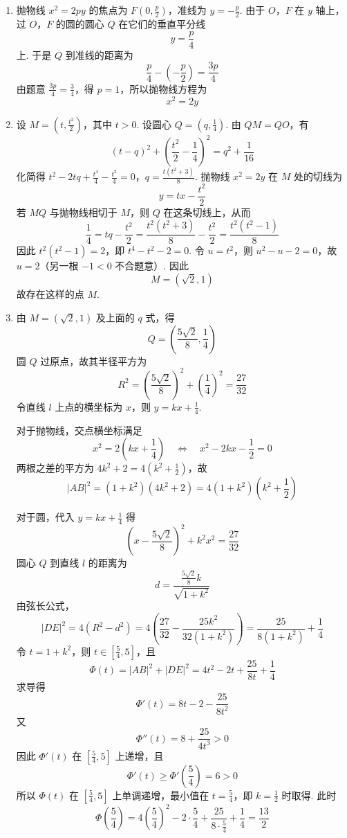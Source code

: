 \begin{solution}
\begin{enumerate}
\item
抛物线 \(x^2=2py\) 的焦点为 \(F\left(0,\frac p2\right)\)，准线为 \(y=-\frac p2\). 由于 \(O\)，\(F\) 在 \(y\) 轴上，过 \(O\)，\(F\) 的圆的圆心 \(Q\) 在它们的垂直平分线
\[
y=\frac p4
\]
上. 于是 \(Q\) 到准线的距离为
\[
\frac p4-\left(-\frac p2\right)=\frac{3p}{4}
\]
由题意 \(\frac{3p}{4}=\frac34\)，得 \(p=1\)，所以抛物线方程为
\[
x^2=2y
\]
\item
设 \(M=(t,\frac{t^2}{2})\)，其中 \(t>0\). 设圆心 \(Q=(q,\frac14)\). 由 \(QM=QO\)，有
\[
(t-q)^2+\left(\frac{t^2}{2}-\frac14\right)^2
=q^2+\frac1{16}
\]
化简得
\(t^2-2tq+\frac{t^4}{4}-\frac{t^2}{4}=0\)，\(q=\frac{t(t^2+3)}8\).
抛物线 \(x^2=2y\) 在 \(M\) 处的切线为
\[
y=tx-\frac{t^2}{2}
\]
若 \(MQ\) 与抛物线相切于 \(M\)，则 \(Q\) 在这条切线上，从而
\[
\frac14=tq-\frac{t^2}{2}
=\frac{t^2(t^2+3)}8-\frac{t^2}{2}
=\frac{t^2(t^2-1)}8
\]
因此
\(t^2(t^2-1)=2\)，即 \(t^4-t^2-2=0\).
令 \(u=t^2\)，则 \(u^2-u-2=0\)，故
\(u=2\)（另一根 \(-1<0\) 不合题意）. 因此
\[
M=(\sqrt2,1)
\]
故存在这样的点 \(M\).
\item
由 \(M=(\sqrt2,1)\) 及上面的 \(q\) 式，得
\[
Q=\left(\frac{5\sqrt2}{8},\frac14\right)
\]
圆 \(Q\) 过原点，故其半径平方为
\[
R^2=\left(\frac{5\sqrt2}{8}\right)^2+\left(\frac14\right)^2
=\frac{27}{32}
\]
令直线 \(l\) 上点的横坐标为 \(x\)，则 \(y=kx+\frac14\).

对于抛物线，交点横坐标满足
\[
x^2=2\left(kx+\frac14\right)
\quad\Longleftrightarrow\quad
x^2-2kx-\frac12=0
\]
两根之差的平方为 \(4k^2+2=4(k^2+\frac12)\)，故
\[
|AB|^2=(1+k^2)\left(4k^2+2\right)
=4(1+k^2)\left(k^2+\frac12\right)
\]

对于圆，代入 \(y=kx+\frac14\) 得
\[
\left(x-\frac{5\sqrt2}{8}\right)^2+k^2x^2=\frac{27}{32}
\]
圆心 \(Q\) 到直线 \(l\) 的距离为
\[
d=\frac{\frac{5\sqrt2}{8}k}{\sqrt{1+k^2}}
\]
由弦长公式，
\[
|DE|^2=4(R^2-d^2)
=4\left(\frac{27}{32}-\frac{25k^2}{32(1+k^2)}\right)
=\frac{25}{8(1+k^2)}+\frac14
\]
令 \(t=1+k^2\)，则 \(t\in[\frac54,5]\)，且
\[
\Phi(t)=|AB|^2+|DE|^2
=4t^2-2t+\frac{25}{8t}+\frac14
\]
求导得
\[
\Phi'(t)=8t-2-\frac{25}{8t^2}
\]
又
\[
\Phi''(t)=8+\frac{25}{4t^3}>0
\]
因此 \(\Phi'(t)\) 在 \([\frac54,5]\) 上递增，且
\[
\Phi'(t)\geqslant\Phi'\left(\frac54\right)=6>0
\]
所以 \(\Phi(t)\) 在 \([\frac54,5]\) 上单调递增，最小值在 \(t=\frac54\)，即 \(k=\frac12\) 时取得. 此时
\[
\Phi\left(\frac54\right)
=4\left(\frac54\right)^2-2\cdot\frac54
+\frac{25}{8\cdot\frac54}+\frac14
=\frac{13}{2}
\]
\end{enumerate}
\end{solution}

